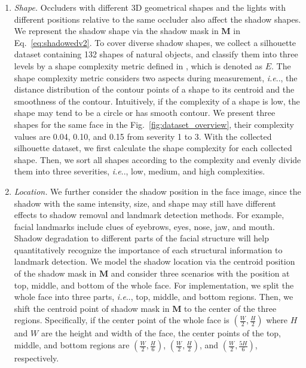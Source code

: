 \documentclass[10pt,twocolumn,letterpaper]{article}
\makeatletter
\newcommand{\figref}[1]{Fig.~\ref{#1}}
\newcommand{\reqref}[1]{Eq.~\eqref{#1}}
\DeclareRobustCommand\onedot{\futurelet\@let@token\@onedot}
\def\@onedot{\ifx\@let@token.\else.\null\fi\xspace}
\def\ie{\emph{i.e}\onedot} \def\Ie{\emph{I.e}\onedot}
\makeatother
\begin{document}
\begin{enumerate}[itemsep = 0 pt, parsep = 0pt, topsep =0pt,fullwidth,itemindent=1em,label=\roman*.]
\item{\textit{Shape.}} 
%
Occluders with different 3D geometrical shapes and the lights with different positions relative to the same occluder also affect the shadow shapes.
%
We represent the shadow shape via the shadow mask in $\mathbf{M}$ in \reqref{eq:shadowedv2}. 
%
To cover diverse shadow shapes, we collect  a silhouette dataset containing 132 shapes of natural objects, and classify them into three levels by a shape complexity metric defined in \cite{chen2005estimating}, which is denoted as $E$. 
%
The shape complexity metric considers two aspects during measurement, \ie, the distance distribution of the contour points of a shape to its centroid and the smoothness of the contour. 
%
Intuitively, if the complexity of a shape is low, the shape may tend to be a circle or has smooth contour. 
%
We present three shapes for the same face in the \figref{fig:dataset_overview}, their complexity values are 0.04, 0.10, and 0.15 from severity 1 to 3.
%
With the collected silhouette dataset, we first calculate the shape complexity for each collected shape. Then, we sort all shapes according to the complexity and evenly divide them into three severities, \ie, low, medium, and high complexities.
%

\item{\textit{Location.}}
%
We further consider the shadow position in the face image, since the shadow with the same intensity, size, and shape may still have different effects to shadow removal and landmark detection methods. For example, facial landmarks include clues of eyebrows, eyes, nose, jaw, and mouth. Shadow degradation to different parts of the facial structure will help quantitatively recognize the importance of each structural information to landmark detection.
%
We model the shadow location via the centroid position of the shadow mask in $\mathbf{M}$ and consider three scenarios with the position at top, middle, and bottom of the whole face.
%
For implementation, we split the whole face into three parts, \ie, top, middle, and bottom regions. Then, we shift the centroid point of shadow mask in $\mathbf{M}$ to the center of the three regions. Specifically, if the center point of the whole face is $(\frac{W}{2}, \frac{H}{2})$ where $H$ and $W$ are the height and width of the face, the center points of the top, middle, and bottom regions are $(\frac{W}{2}, \frac{H}{6})$, $(\frac{W}{2}, \frac{H}{2})$, and $(\frac{W}{2}, \frac{5H}{6})$, respectively.
%
\end{enumerate}
%
\end{document}
